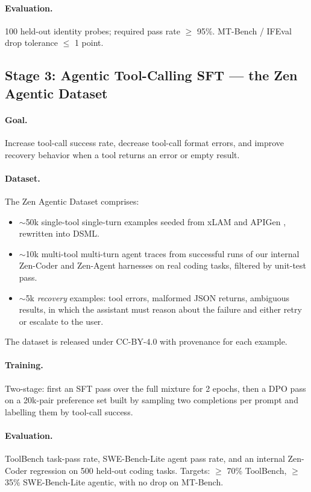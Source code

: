 \documentclass[11pt,a4paper]{article}
\begin{document}
\paragraph{Evaluation.} 100 held-out identity probes; required pass rate $\geq$ 95\%. MT-Bench /
IFEval drop tolerance $\leq$ 1 point.

\subsection{Stage 3: Agentic Tool-Calling SFT --- the Zen Agentic Dataset}

\paragraph{Goal.} Increase tool-call success rate, decrease tool-call format errors, and improve
recovery behavior when a tool returns an error or empty result.

\paragraph{Dataset.} The Zen Agentic Dataset comprises:

\begin{itemize}
  \item $\sim$50k single-tool single-turn examples seeded from xLAM \cite{xlam} and APIGen
        \cite{apigen}, rewritten into DSML.
  \item $\sim$10k multi-tool multi-turn agent traces from successful runs of our internal Zen-Coder
        and Zen-Agent harnesses on real coding tasks, filtered by unit-test pass.
  \item $\sim$5k \emph{recovery} examples: tool errors, malformed JSON returns, ambiguous results, in
        which the assistant must reason about the failure and either retry or escalate to the user.
\end{itemize}

The dataset is released under CC-BY-4.0 with provenance for each example.

\paragraph{Training.} Two-stage: first an SFT pass over the full mixture for 2 epochs, then a
DPO \cite{dpo} pass on a 20k-pair preference set built by sampling two completions per prompt and
labelling them by tool-call success.

\paragraph{Evaluation.} ToolBench \cite{toolbench} task-pass rate, SWE-Bench-Lite agent pass rate, and
an internal Zen-Coder regression on 500 held-out coding tasks. Targets: $\geq$ 70\% ToolBench,
$\geq$ 35\% SWE-Bench-Lite agentic, with no drop on MT-Bench.
\end{document}
